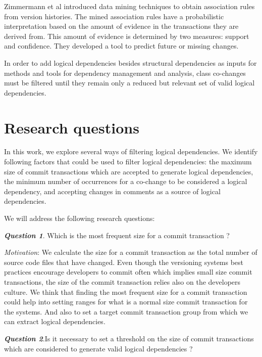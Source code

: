 \documentclass[a4paper,twoside]{article}
\begin{document}
Zimmermann et al \cite{Zimmermann:2004:MVH:998675.999460} introduced data mining techniques to obtain association
rules from version histories.
The mined association rules  have a probabilistic interpretation based on the amount of
evidence in the transactions they are derived from. This
amount of evidence is determined by two measures: 
support and confidence.  They developed a tool to predict future or
missing changes.

In order to add logical dependencies besides structural dependencies as inputs for methods and tools for dependency management and analysis, class co-changes must be filtered until they remain only a reduced but relevant set of valid logical dependencies. 

\section{Research questions}
\label{sec:question}

In this work, we explore several ways of filtering logical dependencies.  We identify following factors that could be used to filter logical dependencies: the maximum size of commit transactions which are accepted to generate logical dependencies, the minimum number of occurrences for a co-change to be considered a logical dependency, and accepting changes in comments as a source of logical dependencies. 

We will address the following research questions:

\textit{\textbf{Question 1}}. Which is the most frequent size for a commit transaction ?  

\textit{Motivation}: We calculate the size for a commit transaction as the total number of source code files that have changed. Even though the versioning systems best practices encourage developers to commit often which implies small size commit transactions, the size of the commit transaction relies also on the developers culture. We think that finding the most frequent size for a commit transaction could help into setting ranges for what is a normal size commit transaction for the systems. And also to set a target commit transaction group from which we can extract logical dependencies.

\textit{\textbf{Question 2}}.Is it necessary to set a threshold on the size of commit transactions which are considered to generate valid logical dependencies ?
\end{document}
